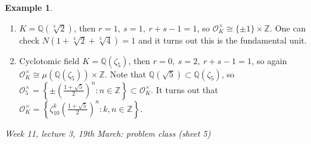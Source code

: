 \documentclass{article}
\newcommand{\Z}{\mathbb{Z}}
\newcommand{\Q}{\mathbb{Q}}
\newcommand{\ri}{\mathcal{O}}
\theoremstyle{definition}
\newtheorem{example}[defn]{Example}
\begin{document}
\begin{example}
\begin{enumerate}
\item $K=\Q\left(\sqrt[3]2\right)$, then $r=1,\ s=1,\ r+s-1=1$, so $\ri_K^\times\cong\{\pm 1\}\times\Z$. One can check $N(1+\sqrt[3]2+\sqrt[3]4)=1$ and it turns out this is the fundamental unit.
\item Cyclotomic field $K=\Q\left(\zeta_5\right)$, then $r=0,\ s=2,\ r+s-1=1$, so again $\ri_K^\times\cong\mu\left(\Q\left(\zeta_5\right)\right)\times\Z$. Note that $\Q\left(\sqrt 5\right)\subset\Q(\zeta_5)$, so $\ri_5^\times=\left\{\pm\left(\frac{1+\sqrt 5}{2}\right)^n:n\in\Z\right\}\subset\ri_K^\times$. It turns out that $\ri_K^\times=\left\{\zeta_{10}^k\left(\frac{1+\sqrt{5}}{2}\right)^n:k,n\in\Z\right\}$.
\end{enumerate}
\end{example}

\begin{flushright}
\textit{Week 11, lecture 3, 19th March: problem class (sheet 5)}
\end{flushright}
\end{document}
